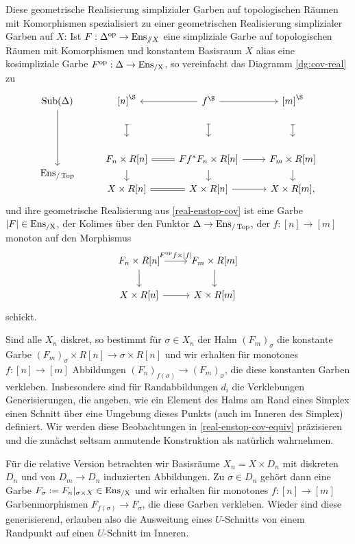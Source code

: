 \begin{bem} \label{real-ensx-cov}
  Diese geometrische Realisierung simplizialer Garben auf
  topologischen Räumen mit Komorphismen spezialisiert zu einer
  geometrischen Realisierung simplizialer Garben auf $X$: Ist $F:
  \Delta^\mathrm{op} \to \operatorname{Ens}_{\mathbin{/\mkern-6mu/} X}$ eine simpliziale Garbe auf
  topologischen Räumen mit Komorphismen und konstantem Basisraum $X$
  alias eine kosimpliziale Garbe $F^\mathrm{op}: \Delta \to \operatorname{Ens_{/X}}$, so
  vereinfacht das Diagramm \ref{dg:cov-real} zu
  \[
  \begin{tikzcd}
    \Sub(\Delta) \arrow{dd}
    & {[n]}^\S \dar[mapsto, shorten <= 3em, yshift=1.5em]
    & \lar f^\S \dar[mapsto, shorten <= 3em, yshift=1.5em] \rar
    & {[m]}^\S \dar[mapsto, shorten <= 3em, yshift=1.5em] \\[25]
    & F_n \times R[n]
    & \lar[equal] Ff^* F_n \times R[n] \rar
    & F_m \times R[m] \\[-2em]
    \Ens_{/\Top}
    & \dar[shorten <= -1em]
    & \dar[shorten <= -1em]
    & \dar[shorten <= -1em] \\[-2em]
    & X \times R[n]
    & \lar[equal] X \times R[n] \rar
    & X \times R[m],
  \end{tikzcd}
  \]
  und ihre geometrische Realisierung aus \ref{real-enstop-cov} ist
  eine Garbe $|F| \in \operatorname{Ens_{/X}}$, der Kolimes über den Funktor $\Delta \to
  \operatorname{Ens}_{/\operatorname{Top}}$, der $f: [n] \to [m]$ monoton auf den Morphismus
  \[ \begin{tikzcd}
    F_n \times R[n] \dar \rar{F\op f \times |f|}
    & F_m \times R[m] \dar \\
    X \times R[n] \rar
    & X \times R[m]
  \end{tikzcd} \]
  schickt.

  Sind alle $X_n$ diskret, so bestimmt für $\sigma \in X_n$ der Halm
  $(F_m)_\sigma$ die konstante Garbe $(F_m)_\sigma \times R[n] \to
  {\sigma} \times R[n]$ und wir erhalten für monotones $f: [n] \to
  [m]$ Abbildungen $(F_n)_{f(\sigma)} \to (F_m)_\sigma$, die diese
  konstanten Garben verkleben. Insbesondere sind für Randabbildungen
  $d_i$ die Verklebungen Generisierungen, die angeben, wie ein Element
  des Halms am Rand eines Simplex einen Schnitt über eine Umgebung
  dieses Punkts (auch im Inneren des Simplex) definiert. Wir werden
  diese Beobachtungen in \ref{real-enstop-cov-equiv} präzisieren und
  die zunächst seltsam anmutende Konstruktion als natürlich
  wahrnehmen.

  Für die relative Version betrachten wir Basisräume $X_n = X \times
  D_n$ mit diskreten $D_n$ und von $D_m \to D_n$ induzierten
  Abbildungen. Zu $\sigma \in D_n$ gehört dann eine Garbe $F_\sigma :=
  F_n|_{\sigma \times X} \in \operatorname{Ens_{/X}}$ und wir erhalten für monotones $f:
  [n] \to [m]$ Garbenmorphismen $F_{f(\sigma)} \to F_\sigma$, die
  diese Garben verkleben. Wieder sind diese generisierend, erlauben
  also die Ausweitung eines $U$-Schnitts von einem Randpunkt auf einen
  $U$-Schnitt im Inneren.
\end{bem}
